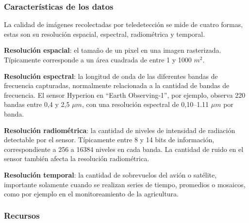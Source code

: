 \subsubsection{Características de los datos}

La calidad de imágenes recolectadas por teledetección se mide de cuatro formas, estas son su resolución espacial,
espectral, radiométrica y temporal.

{\bf Resolución espacial}: el tamaño de un pixel en una imagen rasterizada. Típicamente corresponde a un área cuadrada
de entre 1 y 1000 $m^2$.

{\bf Resolución espectral}: la longitud de onda de las diferentes bandas de frecuencia capturadas, normalmente
relacionada a la cantidad de bandas de frecuencia. El sensor Hyperion en ``Earth Observing-1'', por ejemplo, observa 220
bandas entre 0,4 y 2,5 $\mu m$, con una resolución espectral de 0,10--1.11 $\mu m$ por banda.
\autocite{earth-observatory-earth-observing-1}

{\bf Resolución radiométrica}: la cantidad de niveles de intensidad de radiación detectable por el sensor. Típicamente
entre 8 y 14 bits de información, correspondiente a 256 a 16384 niveles en cada banda. La cantidad de ruido en el
sensor también afecta la resolución radiométrica.

{\bf Resolución temporal}: la cantidad de sobrevuelos del avión o satélite, importante solamente cuando se realizan
series de tiempo, promedios o mosaicos, como por ejemplo en el monitoreamiento de la agricultura.

\subsubsection{Recursos}
